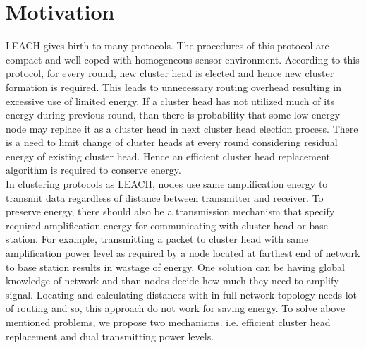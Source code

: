 \documentclass[10pt, conference, compsocconf]{IEEEtran}
\begin{document}
\section{Motivation}
LEACH gives birth to many protocols. The procedures of this protocol are compact and well coped with homogeneous sensor environment. According to this protocol, for every round, new cluster head is elected and hence new cluster formation is required. This leads to unnecessary routing overhead resulting in excessive use of limited energy. If a cluster head has not utilized much of its energy during previous round, than there is probability that some low energy node may replace it as a cluster head in next cluster head election process. There is a need to limit change of cluster heads at every round considering residual energy of existing cluster head. Hence an efficient cluster head replacement algorithm is required to conserve energy.\\
In clustering protocols as LEACH, nodes use same amplification energy to transmit data regardless of distance between transmitter and receiver. To preserve energy, there should also be a transmission mechanism that specify required amplification energy for communicating with cluster head or base station. For example, transmitting a packet to cluster head with same amplification power level as required by a node located at farthest end of network to base station results in wastage of energy. One solution can be having global knowledge of network and than nodes decide how much they need to amplify signal. Locating and calculating distances with in full network topology needs lot of routing and so, this approach do not work for saving energy. To solve above mentioned problems, we propose two mechanisms. i.e. efficient cluster head replacement and dual transmitting power levels.\\
\end{document}
